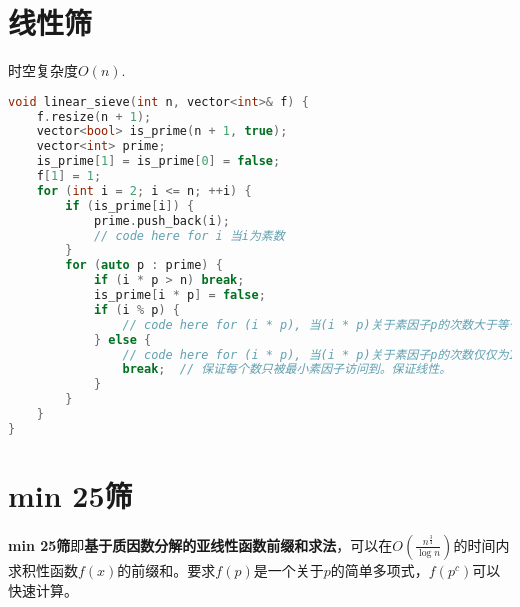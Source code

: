 \section{线性筛}
	\par 时空复杂度$O(n).$

\begin{lstlisting}[language={c++}]
void linear_sieve(int n, vector<int>& f) {
	f.resize(n + 1);
	vector<bool> is_prime(n + 1, true);
	vector<int> prime;
	is_prime[1] = is_prime[0] = false;
	f[1] = 1;
	for (int i = 2; i <= n; ++i) {
		if (is_prime[i]) {
			prime.push_back(i);
			// code here for i 当i为素数
		}
		for (auto p : prime) {
			if (i * p > n) break;
			is_prime[i * p] = false;
			if (i % p) {
				// code here for (i * p), 当(i * p)关于素因子p的次数大于等于2
			} else {
				// code here for (i * p), 当(i * p)关于素因子p的次数仅仅为1
				break;  // 保证每个数只被最小素因子访问到。保证线性。
			}
		}
	}
}
\end{lstlisting}

\section{min 25筛}
\par {\bfseries min 25筛}即{\bfseries 基于质因数分解的亚线性函数前缀和求法}，可以在$O(\frac{n^{\frac{3}{4}}}{\log{n}})$的时间内求积性函数$f(x)$的前缀和。要求$f(p)$是一个关于$p$的简单多项式，$f(p^c)$可以快速计算。

